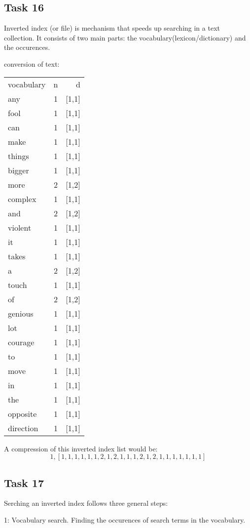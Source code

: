 \documentclass[12pt, a4paper]{article}
\begin{document}
\subsection{Task 16}
Inverted index (or file) is mechanism that speeds up searching in a text collection. 
It consists of two main parts: the vocabulary(lexicon/dictionary) and the occurences.

conversion of text: 
\begin{tabular}{ l c r }
vocabulary 	& n & d \\
any 		& 1 & [1,1]\\
fool 		& 1 & [1,1]\\ 
can 		& 1 & [1,1]\\
make 		& 1 & [1,1]\\
things 		& 1 & [1,1]\\
bigger 		& 1 & [1,1]\\
more 		& 2 & [1,2]\\
complex 	& 1 & [1,1]\\
and 		& 2 & [1,2]\\
violent 	& 1 & [1,1]\\
it 			& 1 & [1,1]\\
takes		& 1 & [1,1]\\
a 			& 2 & [1,2]\\
touch 		& 1 & [1,1]\\
of 			& 2 & [1,2]\\
genious 	& 1 & [1,1]\\
lot 		& 1 & [1,1]\\
courage 	& 1 & [1,1]\\
to 			& 1 & [1,1]\\
move 		& 1 & [1,1]\\
in 			& 1 & [1,1]\\
the 		& 1 & [1,1]\\
opposite 	& 1 & [1,1]\\
direction 	& 1 & [1,1]\\
\end{tabular}

A compression of this inverted index list would be: \\
\[1, [1,1,1,1,1,1,2,1,2,1,1,1,2,1,2,1,1,1,1,1,1,1]\]

\subsection{Task 17}
Serching an inverted index follows three general steps: 

1: Vocabulary search. Finding the occurences of search terms in the vocabulary. 
\end{document}
